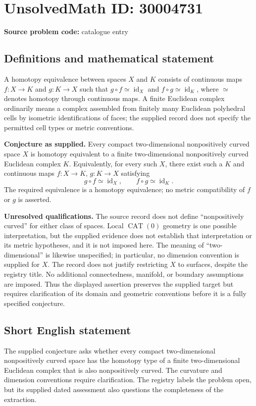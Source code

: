 \documentclass[11pt]{article}
\begin{document}
\section*{UnsolvedMath ID: 30004731}
\textbf{Source problem code:} catalogue entry
\subsection{Definitions and mathematical statement}
A homotopy equivalence between spaces \(X\) and \(K\) consists of continuous maps \(f:X\to K\) and \(g:K\to X\) such that \(g\circ f\simeq\operatorname{id}_X\) and \(f\circ g\simeq\operatorname{id}_K\), where \(\simeq\) denotes homotopy through continuous maps. A finite Euclidean complex ordinarily means a complex assembled from finitely many Euclidean polyhedral cells by isometric identifications of faces; the supplied record does not specify the permitted cell types or metric conventions.

\textbf{Conjecture as supplied.} Every compact two-dimensional nonpositively curved space \(X\) is homotopy equivalent to a finite two-dimensional nonpositively curved Euclidean complex \(K\). Equivalently, for every such \(X\), there exist such a \(K\) and continuous maps \(f:X\to K\), \(g:K\to X\) satisfying
\[
 g\circ f\simeq\operatorname{id}_X,
 \qquad
 f\circ g\simeq\operatorname{id}_K.
\]
The required equivalence is a homotopy equivalence; no metric compatibility of \(f\) or \(g\) is asserted.

\textbf{Unresolved qualifications.} The source record does not define ``nonpositively curved'' for either class of spaces. Local \(\operatorname{CAT}(0)\) geometry is one possible interpretation, but the supplied evidence does not establish that interpretation or its metric hypotheses, and it is not imposed here. The meaning of ``two-dimensional'' is likewise unspecified; in particular, no dimension convention is supplied for \(X\). The record does not justify restricting \(X\) to surfaces, despite the registry title. No additional connectedness, manifold, or boundary assumptions are imposed. Thus the displayed assertion preserves the supplied target but requires clarification of its domain and geometric conventions before it is a fully specified conjecture.
\subsection{Short English statement}
The supplied conjecture asks whether every compact two-dimensional nonpositively curved space has the homotopy type of a finite two-dimensional Euclidean complex that is also nonpositively curved. The curvature and dimension conventions require clarification. The registry labels the problem open, but its supplied dated assessment also questions the completeness of the extraction.
\end{document}
